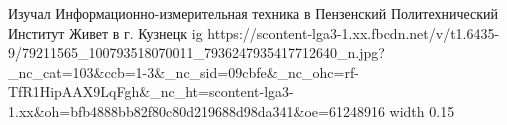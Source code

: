  
 
 
 
 

\par
Изучал Информационно-измерительная техника в Пензенский Политехнический Институт
Живет в г. Кузнецк
\ifcmt
  ig https://scontent-lga3-1.xx.fbcdn.net/v/t1.6435-9/79211565_100793518070011_7936247935417712640_n.jpg?_nc_cat=103&ccb=1-3&_nc_sid=09cbfe&_nc_ohc=rf-TfR1HipAAX9LqFgh&_nc_ht=scontent-lga3-1.xx&oh=bfb4888bb82f80c80d219688d98da341&oe=61248916
  width 0.15
\fi

